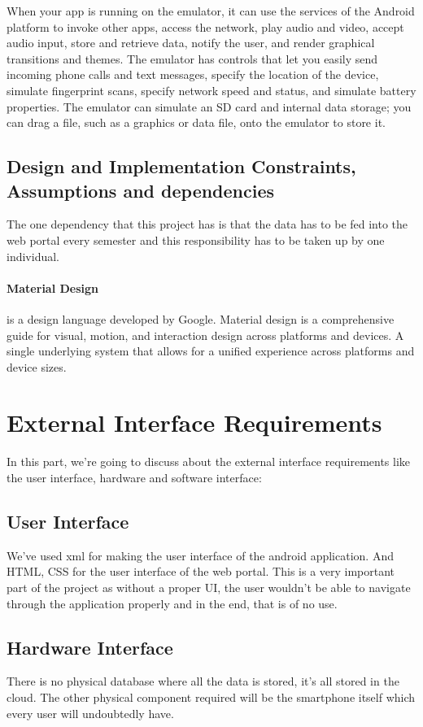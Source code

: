 \documentclass[BTech]{srmuthesis}
\begin{document}
When your app is running on the emulator, it can use the services of the Android platform to
invoke other apps, access the network, play audio and video, accept audio input, store and
retrieve data, notify the user, and render graphical transitions and themes. The emulator has
controls that let you easily send incoming phone calls and text messages, specify the location of
the device, simulate fingerprint scans, specify network speed and status, and simulate battery
properties. The emulator can simulate an SD card and internal data storage; you can drag a file,
such as a graphics or data file, onto the emulator to store it.
\subsection{Design and Implementation Constraints, Assumptions and dependencies}
The one dependency that this project has is that the data has to be fed into the web portal every semester and this responsibility has to be taken up by one individual.

\paragraph{Material Design} is a design language developed by Google. Material design is a comprehensive guide for visual, motion, and interaction design across platforms and devices. A single underlying system that allows for a unified experience across platforms and device sizes.
\section{External Interface Requirements}
In this part, we're going to discuss about the external interface requirements like the user interface, hardware and software interface:
\subsection{User Interface}
We've used xml for making the user interface of the android application. And HTML, CSS for the user interface of the web portal. This is a very important part of the project as without a proper UI, the user wouldn't be able to navigate through the application properly and in the end, that is of no use.
\subsection{Hardware Interface}
There is no physical database where all the data is stored, it's all stored in the cloud. The other physical component required will be the smartphone itself which every user will undoubtedly have.
\end{document}
